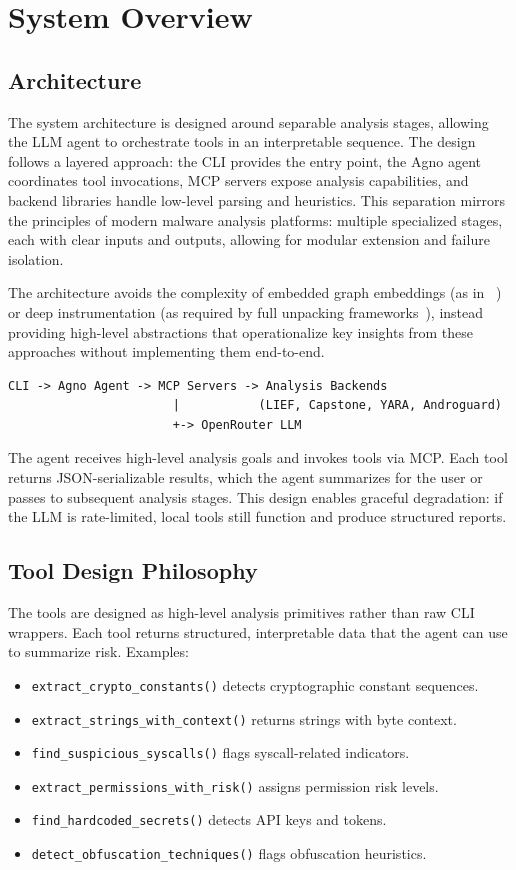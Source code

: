 \documentclass[11pt]{article}
\begin{document}
\section{System Overview}
\subsection{Architecture}
The system architecture is designed around separable analysis stages, allowing the LLM agent to orchestrate tools in an interpretable sequence. The design follows a layered approach: the CLI provides the entry point, the Agno agent coordinates tool invocations, MCP servers expose analysis capabilities, and backend libraries handle low-level parsing and heuristics. This separation mirrors the principles of modern malware analysis platforms: multiple specialized stages, each with clear inputs and outputs, allowing for modular extension and failure isolation.

The architecture avoids the complexity of embedded graph embeddings (as in ~\cite{gemini2018}) or deep instrumentation (as required by full unpacking frameworks~\cite{polyunpack2007}), instead providing high-level abstractions that operationalize key insights from these approaches without implementing them end-to-end.

\begin{verbatim}
CLI -> Agno Agent -> MCP Servers -> Analysis Backends
                       |           (LIEF, Capstone, YARA, Androguard)
                       +-> OpenRouter LLM
\end{verbatim}

The agent receives high-level analysis goals and invokes tools via MCP. Each tool returns JSON-serializable results, which the agent summarizes for the user or passes to subsequent analysis stages. This design enables graceful degradation: if the LLM is rate-limited, local tools still function and produce structured reports.

\subsection{Tool Design Philosophy}
The tools are designed as high-level analysis primitives rather than raw CLI wrappers. Each tool returns structured, interpretable data that the agent can use to summarize risk. Examples:
\begin{itemize}[leftmargin=*]
  \item \texttt{extract\_crypto\_constants()} detects cryptographic constant sequences.
  \item \texttt{extract\_strings\_with\_context()} returns strings with byte context.
  \item \texttt{find\_suspicious\_syscalls()} flags syscall-related indicators.
  \item \texttt{extract\_permissions\_with\_risk()} assigns permission risk levels.
  \item \texttt{find\_hardcoded\_secrets()} detects API keys and tokens.
  \item \texttt{detect\_obfuscation\_techniques()} flags obfuscation heuristics.
\end{itemize}
\end{document}
